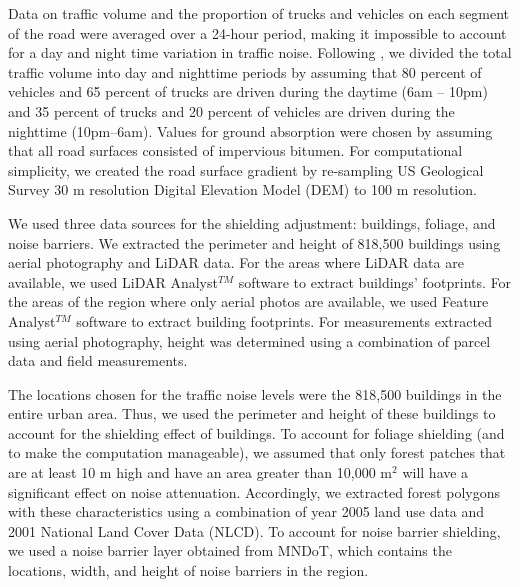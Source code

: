 \documentclass{article}\usepackage[]{graphicx}\usepackage[]{color}
\begin{document}
Data on traffic volume and the proportion of trucks and vehicles on each segment of the road were averaged over a 24-hour period, making it impossible to account for a day and night time variation in traffic noise. Following \citet{Arditi2007}, we divided the total traffic volume into day and nighttime periods by assuming that 80 percent of vehicles and 65 percent of trucks are driven during the daytime (6am -- 10pm) and 35 percent of trucks and 20 percent of vehicles are driven during the nighttime (10pm--6am). Values for ground absorption were chosen by assuming that all road surfaces consisted of impervious bitumen. For computational simplicity, we created the road surface gradient by re-sampling US Geological Survey 30 m resolution Digital Elevation Model (DEM) to 100 m resolution. 

We used three data sources for the shielding adjustment: buildings, foliage, and noise barriers. We extracted the perimeter and height of 818,500 buildings using aerial photography and LiDAR data. For the areas where LiDAR data are available, we used LiDAR Analyst$^{TM}$ software to extract buildings’ footprints. For the areas of the region where only aerial photos are available, we used Feature Analyst$^{TM}$ software to extract building footprints. For measurements extracted using aerial photography, height was determined using a combination of parcel data and field measurements. 

The locations chosen for the traffic noise levels were the 818,500 buildings in the entire urban area. Thus, we used the perimeter and height of these buildings to account for the shielding effect of buildings. To account for foliage shielding (and to make the computation manageable), we assumed that only forest patches that are at least 10 m high and have an area greater than 10,000 m$^2$ will have a significant effect on noise attenuation. Accordingly, we extracted forest polygons with these characteristics using a combination of year 2005 land use data and 2001 National Land Cover Data (NLCD). To account for noise barrier shielding, we used a noise barrier layer obtained from MNDoT, which contains the locations, width, and height of noise barriers in the region.
\end{document}

